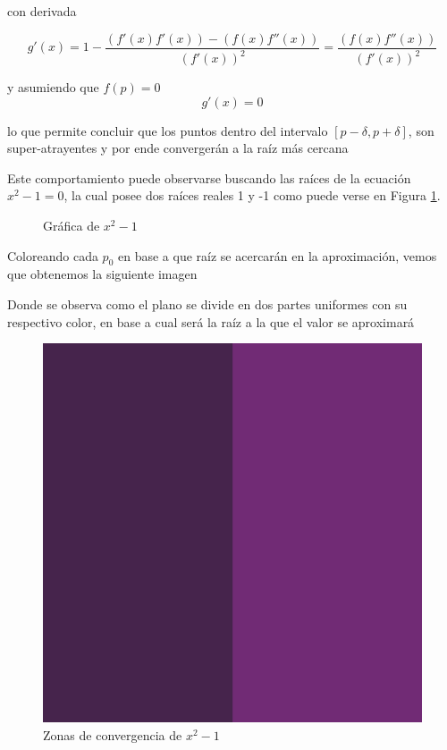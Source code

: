 con derivada 

\begin{displaymath}
     g'(x)= 1 - \frac{(f'(x)f'(x))-(f(x)f''(x))}{(f'(x))^2} = \frac{(f(x)f''(x))}{(f'(x))^2}
\end{displaymath}

y asumiendo que $f(p)=0$
\begin{displaymath}
     g'(x)= 0
\end{displaymath}

lo que permite concluir que los puntos dentro del intervalo $[p-\delta, p+\delta]$, son super-atrayentes y por ende convergerán a la raíz más cercana

Este comportamiento puede observarse buscando las raíces de la ecuación $x^2-1 = 0$, la cual posee dos raíces reales 1 y -1 como puede verse en Figura \ref{fig:graph_cuadratica}. 

\begin{figure}[H]
\centering
    \caption{Gráfica de $x^2-1$}
    \label{fig:graph_cuadratica}
\end{figure}


Coloreando cada $p_0$ en base a que raíz se acercarán en la aproximación, vemos que obtenemos la siguiente imagen

Donde se observa como el plano se divide en dos partes uniformes con su respectivo color, en base a cual será la raíz a la que el valor se aproximará

\begin{figure}[h]
    \centering
    \includegraphics{images/eq1-1.png}
    \caption{Zonas de convergencia de $x^2-1$}
    \label{fig:eq_cuadratica_1}
\end{figure}

